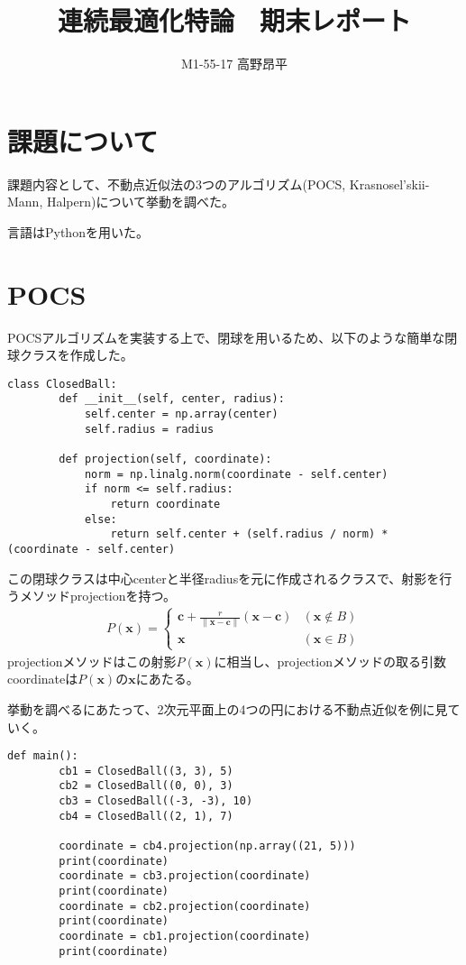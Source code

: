 \documentclass{jsarticle}
\title{連続最適化特論　期末レポート}
\author{M1-55-17 高野昂平}
\date{}
\begin{document}
\maketitle
\section*{課題について}
課題内容として、不動点近似法の3つのアルゴリズム(POCS, Krasnosel'skii-Mann, Halpern)について挙動を調べた。
\par 言語はPythonを用いた。
\section*{POCS}
POCSアルゴリズムを実装する上で、閉球を用いるため、以下のような簡単な閉球クラスを作成した。
\begin{lstlisting}[caption = 閉球クラス]
    class ClosedBall:
        def __init__(self, center, radius):
            self.center = np.array(center)
            self.radius = radius

        def projection(self, coordinate):
            norm = np.linalg.norm(coordinate - self.center)
            if norm <= self.radius:
                return coordinate
            else:
                return self.center + (self.radius / norm) * (coordinate - self.center)
\end{lstlisting}
\par この閉球クラスは中心centerと半径radiusを元に作成されるクラスで、射影を行うメソッドprojectionを持つ。
\large
\begin{eqnarray}
    P(\bm{x}) = \left\{
        \begin{array}{ll}
            \bm{c} + \frac{r}{\|\bm{x} - \bm{c}\|}(\bm{x} - \bm{c}) & (\bm{x} \notin B) \\
            \bm{x} & (\bm{x} \in B)
        \end{array}
    \right.
\end{eqnarray}
\normalsize
projectionメソッドはこの射影$P(\bm{x})$に相当し、projectionメソッドの取る引数coordinateは$P(\bm{x})$の$\bm{x}$にあたる。
\par 挙動を調べるにあたって、2次元平面上の4つの円における不動点近似を例に見ていく。
\begin{lstlisting}[caption = 4つの円における不動点近似]
    def main():
        cb1 = ClosedBall((3, 3), 5)
        cb2 = ClosedBall((0, 0), 3)
        cb3 = ClosedBall((-3, -3), 10)
        cb4 = ClosedBall((2, 1), 7)

        coordinate = cb4.projection(np.array((21, 5)))
        print(coordinate)
        coordinate = cb3.projection(coordinate)
        print(coordinate)
        coordinate = cb2.projection(coordinate)
        print(coordinate)
        coordinate = cb1.projection(coordinate)
        print(coordinate)
\end{lstlisting}
\end{document}
